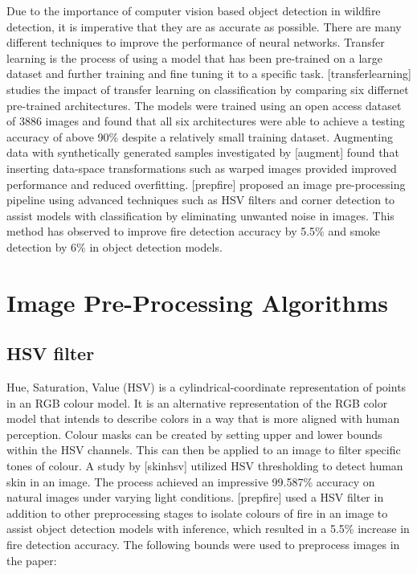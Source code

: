 Due to the importance of computer vision based object detection in
wildfire detection, it is imperative that they are as accurate as
possible. There are many different techniques to improve the performance
of neural networks. Transfer learning is the process of using a model
that has been pre-trained on a large dataset and further training and
fine tuning it to a specific task. {[}transferlearning{]} studies the
impact of transfer learning on classification by comparing six differnet
pre-trained architectures. The models were trained using an open access
dataset of 3886 images and found that all six architectures were able to
achieve a testing accuracy of above 90\% despite a relatively small
training dataset. Augmenting data with synthetically generated samples
investigated by {[}augment{]} found that inserting data-space
transformations such as warped images provided improved performance and
reduced overfitting. {[}prepfire{]} proposed an image pre-processing
pipeline using advanced techniques such as HSV filters and corner
detection to assist models with classification by eliminating unwanted
noise in images. This method has observed to improve fire detection
accuracy by 5.5\% and smoke detection by 6\% in object detection models.


\section{Image Pre-Processing Algorithms}

\subsection{HSV filter}

Hue, Saturation, Value (HSV) is a cylindrical-coordinate representation
of points in an RGB colour model. It is an alternative representation of
the RGB color model that intends to describe colors in a way that is
more aligned with human perception. Colour masks can be created by
setting upper and lower bounds within the HSV channels. This can then be
applied to an image to filter specific tones of colour. A study by
{[}skinhsv{]} utilized HSV thresholding to detect human skin in an
image. The process achieved an impressive 99.587\% accuracy on natural
images under varying light conditions. {[}prepfire{]} used a HSV filter
in addition to other preprocessing stages to isolate colours of fire in
an image to assist object detection models with inference, which
resulted in a 5.5\% increase in fire detection accuracy. The following
bounds were used to preprocess images in the paper:

